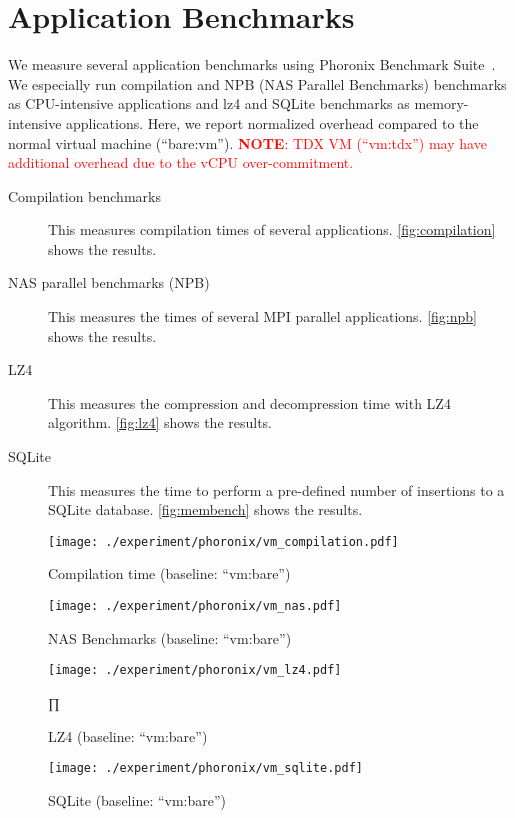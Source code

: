 \documentclass[letterpaper,twocolumn,10pt]{article}
\newcommand{\MP}[1]{\textcolor{red}{#1}}
\newcommand{\grumbler}[2]{\MP{{\bf #1}: #2}}
\newcommand{\note}[1]{\grumbler{NOTE}{#1}}
\begin{document}
\section{Application Benchmarks}
\label{sec:app:benchmark}

We measure several application benchmarks using Phoronix Benchmark Suite~\cite{phoronix}.
We especially run compilation and NPB (NAS Parallel Benchmarks) benchmarks as CPU-intensive applications and lz4 and SQLite benchmarks as memory-intensive applications.
Here, we report normalized overhead compared to the normal virtual machine (``bare:vm'').
\note{TDX VM (``vm:tdx'') may have additional overhead due to the vCPU over-commitment.}

\begin{description}
\item[Compilation benchmarks~\cite{compilation}] This measures compilation times of several applications. \autoref{fig:compilation} shows the results.
\item[NAS parallel benchmarks (NPB)~\cite{npb}] This measures the times of several MPI parallel applications. \autoref{fig:npb} shows the results.
\item[LZ4~\cite{lz4}] This measures the compression and decompression time with LZ4 algorithm. \autoref{fig:lz4} shows the results.
\item[SQLite~\cite{sqlite_bench}] This measures the time to perform a pre-defined number of insertions to a SQLite database. \autoref{fig:membench} shows the results.
\end{description}

\begin{figure*}[t]
\centering
\texttt{[image: ./experiment/phoronix/vm\_compilation.pdf]}
\caption{Compilation time (baseline: ``vm:bare'')}
\label{fig:compilation}
\end{figure*}

\begin{figure*}[t]
\centering
\texttt{[image: ./experiment/phoronix/vm\_nas.pdf]}
\caption{NAS Benchmarks (baseline: ``vm:bare'')}
\label{fig:npb}
\end{figure*}

\begin{figure*}[t]
\centering
\texttt{[image: ./experiment/phoronix/vm\_lz4.pdf]}
\caption{LZ4  (baseline: ``vm:bare'')}
\label{fig:lz4}∏
\end{figure*}

\begin{figure*}[t]
\centering
\texttt{[image: ./experiment/phoronix/vm\_sqlite.pdf]}
\caption{SQLite  (baseline: ``vm:bare'')}
\label{fig:sqlite}
\end{figure*}
\end{document}

